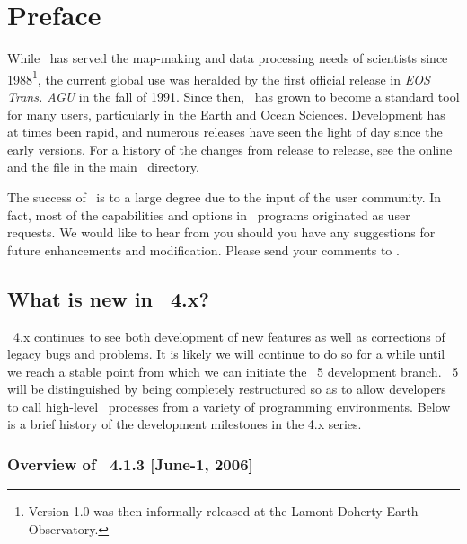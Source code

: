 %
%
\chapter{Preface} 
\label{ch:1}
\thispagestyle{headings}

While \GMT\ has served the map-making and data processing needs of scientists since 1988\footnote{Version
1.0 was then informally released at the Lamont-Doherty Earth Observatory.}, the current global use was
heralded by the first official release in {\it EOS Trans. AGU} in the fall of 1991.  Since then,
\GMT\ has grown to become a standard tool for many users, particularly in the Earth and Ocean Sciences.
Development has at times been rapid, and numerous releases have seen the light of day since the early
versions.  For a history of the changes from release to release, see the online
and the file  in the main \GMT\ directory.

The success of \GMT\ is to a large degree due to the input of the user community. In fact, most of the
capabilities and options in \GMT\ programs originated as user requests.
We would like to hear from you should you have any suggestions for future enhancements and modification.
Please send your comments to
.

\section{What is new in \gmt\ 4.x?}

\GMT\ 4.x continues to see both development of new features as well as corrections of
legacy bugs and problems.  It is likely we will continue to do so for a while until we
reach a stable point from which we can initiate the \GMT\ 5 development branch.  \GMT\ 5
will be distinguished by being completely restructured so as to allow developers to call
high-level \GMT\ processes from a variety of programming environments.  Below is a brief
history of the development milestones in the 4.x series.

\subsection{Overview of \gmt\ 4.1.3 [June-1, 2006]}

